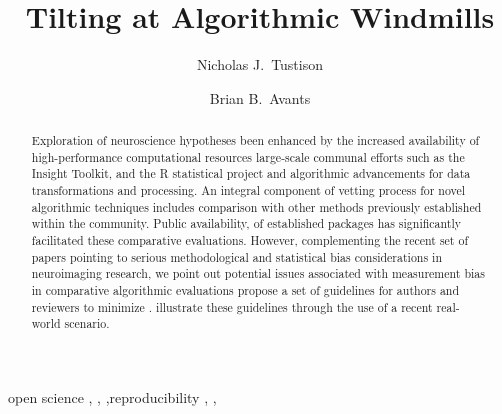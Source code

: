 \documentclass[final,5p,times,twocolumn]{elsarticle}
\begin{document}



\begin{frontmatter}

\title{Tilting at Algorithmic Windmills}

\author[label1]{Nicholas J.~Tustison
  }
\author[label2]{Brian B.~Avants}
\address[label1]{Department of Radiology and Medical Imaging, University of Virginia, Charlottesville, VA}
\address[label2]{Penn Image Computing and Science Laboratory, University of Pennsylvania,
                Philadelphia, PA}


\linenumbers

\begin{abstract} 
Exploration of neuroscience hypotheses  been  enhanced
by the increased availability of high-performance computational resources
\deleted[id=hj]{,} large-scale
communal  efforts such as the Insight Toolkit, and the R statistical project\replaced[id=hj]{;}{,} and
algorithmic advancements for data transformations and processing. 
An integral component of  vetting process for
novel algorithmic techniques includes comparison with other methods previously
established within the community.  Public availability,  of established packages has significantly 
facilitated these comparative evaluations.  However, complementing the
recent set of papers pointing to serious methodological and statistical
bias considerations in neuroimaging research, we point out potential 
issues associated with  measurement bias in comparative algorithmic
evaluations  propose a set of guidelines for authors and reviewers to minimize .
 illustrate these guidelines
through the use of a recent real-world scenario.
\end{abstract}
\begin{keyword}
open science \sep {} \sep {} \sep reproducibility  \sep {} \sep {}
\end{keyword}

\end{frontmatter}
%
%
\newpage
\end{document}
